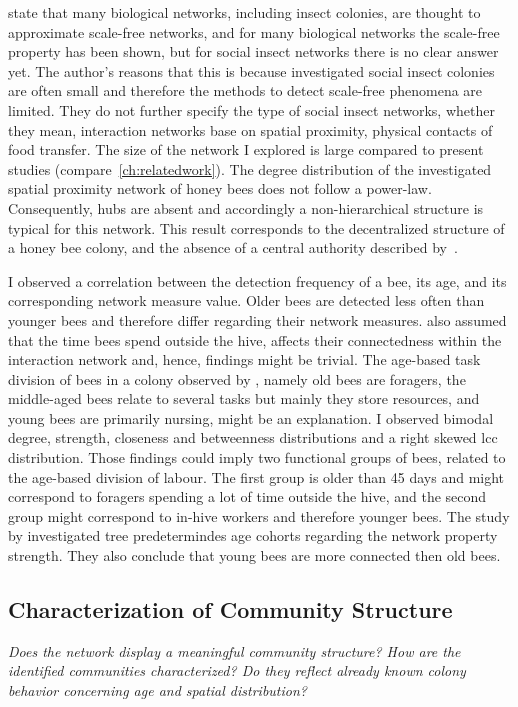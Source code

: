 \textcite{charbonneau2013social} state that many biological networks, including insect colonies, are thought to approximate scale-free networks, and for many biological networks the scale-free property has been shown, but for social insect networks there is no clear answer yet. The author's reasons that this is because investigated social insect colonies are often small and therefore the methods to detect scale-free phenomena are limited. They do not further specify the type of social insect networks, whether they mean, interaction networks base on spatial proximity, physical contacts of food transfer.
The size of the network I explored is large compared to present studies (compare~\ref{ch:relatedwork}).
The degree distribution of the investigated spatial proximity network of honey bees does not follow a power-law. Consequently, hubs are absent and accordingly a non-hierarchical structure is typical for this network.
This result corresponds to the decentralized structure of a honey bee colony, and the absence of a central authority described by~\textcite{seeley1989honey}.

I observed a correlation between the detection frequency of a bee, its age, and its corresponding network measure value. Older bees are detected less often than younger bees and therefore differ regarding their network measures.
\textcite{baracchi2014socio} also assumed that the time bees spend outside the hive, affects their connectedness within the interaction network and, hence, findings might be trivial.
The age-based task division of bees in a colony observed by \textcite{seeley1989social}, namely old bees are foragers, the middle-aged bees relate to several tasks but mainly they store resources, and young bees are primarily nursing, might be an explanation.
I observed bimodal degree, strength, closeness and betweenness distributions and a right skewed lcc distribution. Those findings could imply two functional groups of bees, related to the age-based division of labour. The first group is older than 45 days and might correspond to foragers spending a lot of time outside the hive, and the second group might correspond to in-hive workers and therefore younger bees.
The study by \textcite{baracchi2014socio} investigated tree predetermindes age cohorts regarding the network property strength. They also conclude that young bees are more connected then old bees.

\subsection{Characterization of Community Structure}
\emph{Does the network display a meaningful community structure?
How are the identified communities characterized?
Do they reflect already known colony behavior concerning age and spatial distribution?}

